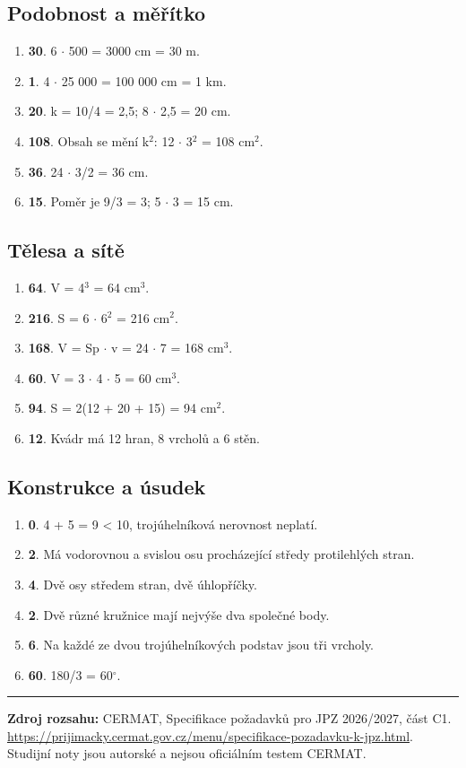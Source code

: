 \documentclass[11pt,a4paper]{article}
\begin{document}
\subsection*{Podobnost a měřítko}
\begin{enumerate}[label=\arabic*.,start=25,leftmargin=*,itemsep=3pt]
\item \textbf{30}. 6 $\cdot$ 500 = 3000 cm = 30 m.
\item \textbf{1}. 4 $\cdot$ 25 000 = 100 000 cm = 1 km.
\item \textbf{20}. k = 10/4 = 2,5; 8 $\cdot$ 2,5 = 20 cm.
\item \textbf{108}. Obsah se mění k$^2$: 12 $\cdot$ 3$^2$ = 108 cm$^2$.
\item \textbf{36}. 24 $\cdot$ 3/2 = 36 cm.
\item \textbf{15}. Poměr je 9/3 = 3; 5 $\cdot$ 3 = 15 cm.
\end{enumerate}
\subsection*{Tělesa a sítě}
\begin{enumerate}[label=\arabic*.,start=31,leftmargin=*,itemsep=3pt]
\item \textbf{64}. V = 4$^3$ = 64 cm$^3$.
\item \textbf{216}. S = 6 $\cdot$ 6$^2$ = 216 cm$^2$.
\item \textbf{168}. V = Sp $\cdot$ v = 24 $\cdot$ 7 = 168 cm$^3$.
\item \textbf{60}. V = 3 $\cdot$ 4 $\cdot$ 5 = 60 cm$^3$.
\item \textbf{94}. S = 2(12 + 20 + 15) = 94 cm$^2$.
\item \textbf{12}. Kvádr má 12 hran, 8 vrcholů a 6 stěn.
\end{enumerate}
\subsection*{Konstrukce a úsudek}
\begin{enumerate}[label=\arabic*.,start=37,leftmargin=*,itemsep=3pt]
\item \textbf{0}. 4 + 5 = 9 < 10, trojúhelníková nerovnost neplatí.
\item \textbf{2}. Má vodorovnou a svislou osu procházející středy protilehlých stran.
\item \textbf{4}. Dvě osy středem stran, dvě úhlopříčky.
\item \textbf{2}. Dvě různé kružnice mají nejvýše dva společné body.
\item \textbf{6}. Na každé ze dvou trojúhelníkových podstav jsou tři vrcholy.
\item \textbf{60}. 180/3 = 60$^\circ$.
\end{enumerate}

\fi
\hrule\vspace{3mm}
{\sffamily\footnotesize\color{muted} \textbf{Zdroj rozsahu:} CERMAT, Specifikace požadavků pro JPZ 2026/2027, část C1. \url{https://prijimacky.cermat.gov.cz/menu/specifikace-pozadavku-k-jpz.html}. Studijní noty jsou autorské a nejsou oficiálním testem CERMAT.}
\end{document}
